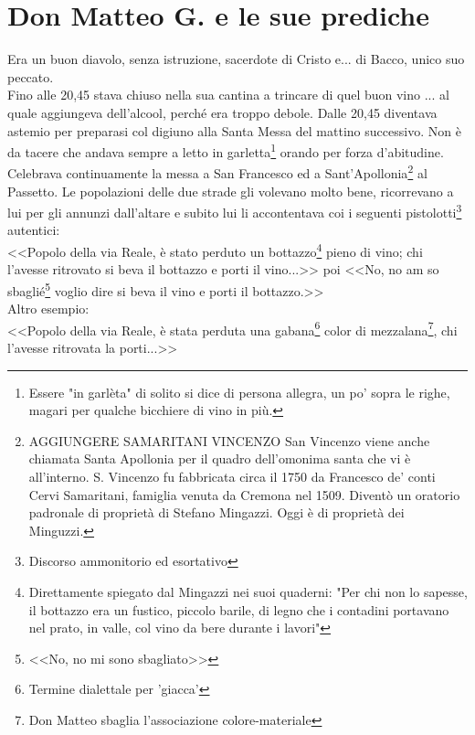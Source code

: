 
\chapter{Don Matteo G. e le sue prediche}
Era un buon diavolo, senza istruzione, sacerdote di Cristo e... di Bacco, unico suo peccato.\\
\indent Fino alle 20,45 stava chiuso nella sua cantina a trincare di quel buon vino ... al quale aggiungeva dell'alcool, perché era troppo debole. Dalle 20,45 diventava astemio per preparasi col digiuno alla Santa Messa del mattino successivo. Non è da tacere che andava sempre a letto in garletta\footnote{Essere "in garlèta" di solito si dice di persona allegra, un po' sopra le righe, magari per qualche bicchiere di vino in più.} orando per forza d'abitudine. Celebrava continuamente la messa a San Francesco ed a Sant'Apollonia\footnote{AGGIUNGERE SAMARITANI VINCENZO San Vincenzo viene anche chiamata Santa Apollonia per il quadro dell'omonima santa che vi è all'interno. S. Vincenzo fu fabbricata circa il 1750 da Francesco de' conti Cervi Samaritani, famiglia venuta da Cremona nel 1509. Diventò un oratorio padronale di proprietà di Stefano Mingazzi. Oggi è di proprietà dei Minguzzi.} al Passetto. Le popolazioni delle due strade gli volevano molto bene, ricorrevano a lui per gli annunzi dall'altare e subito lui li accontentava coi i seguenti pistolotti\footnote{Discorso ammonitorio ed esortativo} autentici:\\
\indent <<Popolo della via Reale, è stato perduto un bottazzo\footnote{Direttamente spiegato dal Mingazzi nei suoi quaderni: "Per chi non lo sapesse, il bottazzo era un fustico, piccolo barile, di legno che i contadini portavano nel prato, in valle, col vino da bere durante i lavori"} pieno di vino; chi l'avesse ritrovato si beva il bottazzo e porti il vino...>> poi <<No, no am so sbaglié\footnote{<<No, no mi sono sbagliato>>} voglio dire si beva il vino e porti il bottazzo.>>\\
\indent Altro esempio:\\
\indent<<Popolo della via Reale, è stata perduta una gabana\footnote{Termine dialettale per 'giacca'} color di mezzalana\footnote{Don Matteo sbaglia l'associazione colore-materiale}, chi l'avesse ritrovata la porti...>>

